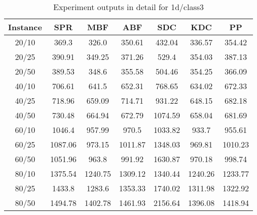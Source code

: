 \begin{table}[ht!]
    \caption{Experiment outputs in detail for 1d/class3}
    \centering
    \begin{tabular}{@{}ccccccc@{}}
        \toprule
        {\bfseries Instance} & {\bfseries SPR} & {\bfseries MBF}
        & {\bfseries ABF} & {\bfseries SDC} & {\bfseries KDC} & {\bfseries PP}\\
        \midrule
        20/10 & 369.3 & 326.0 & 350.61 & 432.04 & 336.57 & 354.42\\
        20/25 & 390.91 & 349.25 & 371.26 & 529.4 & 354.03 & 387.13\\
        20/50 & 389.53 & 348.6 & 355.58 & 504.46 & 354.25 & 366.09\\
        40/10 & 706.61 & 641.5 & 652.31 & 768.65 & 634.02 & 672.33\\
        40/25 & 718.96 & 659.09 & 714.71 & 931.22 & 648.15 & 682.18\\
        40/50 & 730.48 & 664.94 & 672.79 & 1074.59 & 658.04 & 681.69\\
        60/10 & 1046.4 & 957.99 & 970.5 & 1033.82 & 933.7 & 955.61\\
        60/25 & 1087.06 & 973.15 & 1011.87 & 1348.03 & 969.81 & 1010.23\\
        60/50 & 1051.96 & 963.8 & 991.92 & 1630.87 & 970.18 & 998.74\\
        80/10 & 1375.54 & 1240.75 & 1309.12 & 1340.44 & 1240.26 & 1233.77\\
        80/25 & 1433.8 & 1283.6 & 1353.33 & 1740.02 & 1311.98 & 1322.92\\
        80/50 & 1494.78 & 1402.78 & 1461.93 & 2156.64 & 1396.08 & 1418.94\\
        \bottomrule
    \end{tabular}
\end{table}